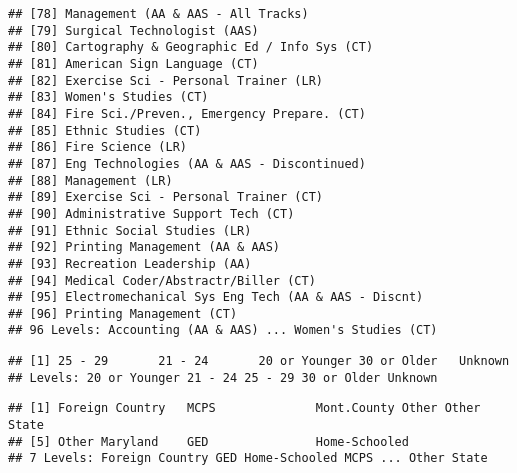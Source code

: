 \documentclass[]{article}
\newenvironment{Shaded}{\begin{snugshade}}{\end{snugshade}}
\newcommand{\KeywordTok}[1]{\textcolor[rgb]{0.13,0.29,0.53}{\textbf{#1}}}
\newcommand{\OperatorTok}[1]{\textcolor[rgb]{0.81,0.36,0.00}{\textbf{#1}}}
\newcommand{\NormalTok}[1]{#1}
\begin{document}
\begin{verbatim}
## [78] Management (AA & AAS - All Tracks)                
## [79] Surgical Technologist (AAS)                       
## [80] Cartography & Geographic Ed / Info Sys (CT)       
## [81] American Sign Language (CT)                       
## [82] Exercise Sci - Personal Trainer (LR)              
## [83] Women's Studies (CT)                              
## [84] Fire Sci./Preven., Emergency Prepare. (CT)        
## [85] Ethnic Studies (CT)                               
## [86] Fire Science (LR)                                 
## [87] Eng Technologies (AA & AAS - Discontinued)        
## [88] Management (LR)                                   
## [89] Exercise Sci - Personal Trainer (CT)              
## [90] Administrative Support Tech (CT)                  
## [91] Ethnic Social Studies (LR)                        
## [92] Printing Management (AA & AAS)                    
## [93] Recreation Leadership (AA)                        
## [94] Medical Coder/Abstractr/Biller (CT)               
## [95] Electromechanical Sys Eng Tech (AA & AAS - Discnt)
## [96] Printing Management (CT)                          
## 96 Levels: Accounting (AA & AAS) ... Women's Studies (CT)
\end{verbatim}

\begin{Shaded}
\end{Shaded}

\begin{verbatim}
## [1] 25 - 29       21 - 24       20 or Younger 30 or Older   Unknown      
## Levels: 20 or Younger 21 - 24 25 - 29 30 or Older Unknown
\end{verbatim}

\begin{Shaded}
\end{Shaded}

\begin{verbatim}
## [1] Foreign Country   MCPS              Mont.County Other Other State      
## [5] Other Maryland    GED               Home-Schooled    
## 7 Levels: Foreign Country GED Home-Schooled MCPS ... Other State
\end{verbatim}
\end{document}
